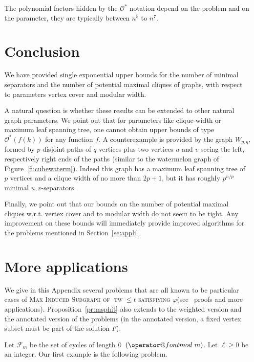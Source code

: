 \documentclass{llncs}
\makeatletter
\newcommand{\cF}{\mathcal{F}}
\newcommand{\cO}{\mathcal{O}}
\newcommand{\tw}{\operatorname{tw}}
\newcommand{\pmc}{potential maximal clique}
\def\imod#1{\allowbreak\mkern10mu({\operator@font mod}\,\,#1)}
\newcommand{\msphit}{\textsc{Max\- Induced\- Subgraph\- of\- $\tw\leq t$\- satisfiying\- $\varphi$}}
\makeatother
\begin{document}
The polynomial factors hidden by the $\cO^*$ notation depend on the problem and on the parameter, they are typically between $n^5$ to $n^7$. 





\section{Conclusion}

We have provided single exponential upper bounds for the number of minimal separators and the number of potential maximal cliques of graphs, with respect to parameters vertex cover and modular width. 

A natural question is whether these results can be extended to other natural graph parameters. We point out that for parameters like clique-width or maximum leaf spanning tree, one cannot obtain upper bounds of type $\cO^*(f(k))$ for any function $f$. A counterexample is  provided by the graph $W_{p,q}$, formed by $p$ disjoint paths of  $q$ vertices plus two vertices $u$ and $v$ seeing the left, respectively right ends of the paths (similar to the watermelon graph of Figure~\ref{fi:cubewaterm}). Indeed this graph has a maximum leaf spanning tree of $p$ vertices and a clique width of no more than $2p+1$, but it has roughly $p^{n/p}$ minimal $u,v$-separators. 

Finally, we point out that our bounds on the number of \pmc s w.r.t. vertex cover and to modular width do not seem to be tight. Any improvement on these bounds will immediately provide improved algorithms for the problems mentioned in Section~\ref{se:appli}.


 
\appendix

\section{More applications}\label{ap:appli}
We give in this Appendix several problems that are all known to be particular cases of \msphit (see~\cite{FoToVi14} proofs and more applications). Proposition~\ref{pr:msphit} also extends to the weighted version and the annotated version of the problems (in the annotated version, a fixed vertex subset must be part of the solution $F$).

  Let   $\cF_m$  be the set of cycles of length  $0\imod{m}$.
   Let  $\ell \geq 0$ be an  integer.  Our first example is the following  problem.
   
\end{document}
